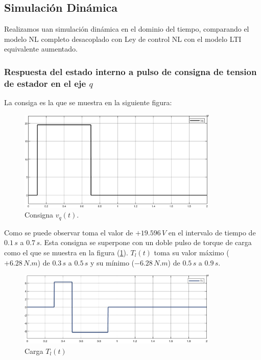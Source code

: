 \documentclass{article}
\begin{document}

\subsection{Simulación Dinámica}

Realizamos uan simulación dinámica en el dominio del tiempo, comparando el modelo NL completo 
desacoplado con Ley de control NL con el modelo LTI equivalente aumentado.

\subsubsection{Respuesta del estado interno a pulso de consigna de tension de estador en el eje $q$}

La consiga es la que se muestra en la siguiente figura:

\begin{figure}[H]
    \centering
    \includegraphics[width=0.85\textwidth]{5.1.6_consigna.jpg}
    \caption{Consigna $v_q(t)$.}
\end{figure}

Como se puede observar toma el valor de $+19.596 \, V$ en el intervalo de tiempo de $0.1 \, s$ a $0.7 \, s$.
Esta consigna se superpone con un doble pulso de torque de carga como el que se muestra en la figura (\ref{fig:torque_carga}).
$T_l(t)$ toma su  valor máximo ($+6.28 \, N.m$) de $0.3 \, s$ a $0.5 \, s$ y su mínimo ($-6.28 \, N.m$) de $0.5 \, s$ a $0.9 \, s$.

\begin{figure}[H]
    \centering
    \includegraphics[width=0.85\textwidth]{5.1.6_carga2.jpg}
    \caption{Carga $T_l(t)$}
    \label{fig:torque_carga}
\end{figure}
\end{document}
